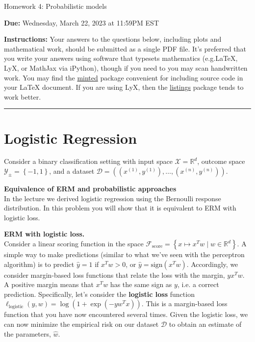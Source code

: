 \documentclass{article}
\newcommand{\nyuparagraph}[1]{\vspace{0.3cm}\textcolor{nyupurple}{\bf \large #1}\\}
\newcommand{\ruleskip}{\bigskip\hrule\bigskip}
\theoremstyle{plain}
\theoremstyle{definition}
\begin{document}

\pagestyle{myheadings} 

\begin{center}
{\Large
Homework 4: Probabilistic models
} 
\end{center}

{
{ \color{nyupurple} \textbf{Due:} Wednesday, March 22, 2023 at 11:59PM EST} 
} 

\textbf{Instructions: }Your answers to the questions below, including plots and mathematical work, should be submitted as a single PDF file.  It's preferred that you write your answers using software that typesets mathematics (e.g.LaTeX, LyX, or MathJax via iPython), though if you need to you may scan handwritten work.  You may find the \href{https://github.com/gpoore/minted}{minted} package convenient for including source code in your LaTeX document.  If you are using LyX, then the \href{https://en.wikibooks.org/wiki/LaTeX/Source_Code_Listings}{listings} package tends to work better.

\ruleskip

\section{Logistic Regression}
\label{sec:lr}
Consider a binary classification setting with input
space $\mathcal{X}=\mathbb{R}^{d}$, outcome space $\mathcal{Y}_{\pm}=\left\{ -1,1\right\} $,
and a dataset $\mathcal{D}=\left((x^{(1)},y^{(1)}),\ldots,(x^{(n)},y^{(n)})\right)$.


\nyuparagraph{\label{subsec:erm-bernoulli-setup}Equivalence of ERM and probabilistic
approaches}
In the lecture we derived logistic regression using the Bernoulli response distribution.
In this problem you will show that it is equivalent to ERM with logistic loss.

\textbf{ERM with logistic loss.}\\
Consider a linear scoring function in the space $\mathcal{F}_{\text{score}}=\left\{ x\mapsto x^{T}w\mid w\in\mathbb{R}^{d}\right\} $.
A simple way to make predictions (similar to what we've seen with the perceptron algorithm)
is to predict $\hat{y}=1$ if $x^Tw > 0$, or $\hat{y} = \text{sign}(x^Tw)$.
Accordingly, we consider margin-based loss functions that relate the loss with the margin, $yx^Tw$.
A positive margin means that $x^Tw$ has the same sign as $y$, i.e. a correct prediction.
Specifically, let's consider the \textbf{logistic loss} function $\ell_{\text{logistic}}(y, w)=\log\left(1+\exp(-yw^Tx)\right)$.
This is a margin-based loss function that you have now encountered several times.
Given the logistic loss, we can now minimize the empirical risk on our dataset $\mathcal{D}$ to obtain an estimate of the parameters, $\hat{w}$.
\end{document}
